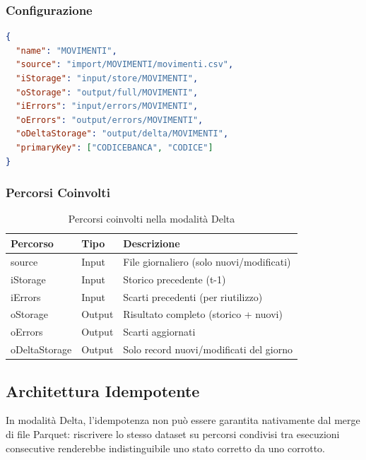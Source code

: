 \documentclass[12pt,a4paper,openright,twoside]{book}
\begin{document}
\newpage
\subsubsection{Configurazione}

\begin{lstlisting}[language=JSON, caption={Esempio di configurazione in modalità Delta}, label={lst:config-delta}]
{
  "name": "MOVIMENTI",
  "source": "import/MOVIMENTI/movimenti.csv",
  "iStorage": "input/store/MOVIMENTI",
  "oStorage": "output/full/MOVIMENTI",
  "iErrors": "input/errors/MOVIMENTI",
  "oErrors": "output/errors/MOVIMENTI",
  "oDeltaStorage": "output/delta/MOVIMENTI",
  "primaryKey": ["CODICEBANCA", "CODICE"]
}
\end{lstlisting}

\subsubsection{Percorsi Coinvolti}

\begin{table}[H]
\centering\small
\begin{tabularx}{\textwidth}{>{\ttfamily}l l X}
\toprule
\normalfont\textbf{Percorso} & \textbf{Tipo} & \textbf{Descrizione} \\
\midrule
source        & Input  & File giornaliero (solo nuovi/modificati) \\
iStorage      & Input  & Storico precedente (t-1) \\
iErrors       & Input  & Scarti precedenti (per riutilizzo) \\
oStorage      & Output & Risultato completo (storico + nuovi) \\
oErrors       & Output & Scarti aggiornati \\
oDeltaStorage & Output & Solo record nuovi/modificati del giorno \\
\bottomrule
\end{tabularx}
\caption{Percorsi coinvolti nella modalità Delta}
\label{tab:percorsi-delta}
\end{table}

\subsection{Architettura Idempotente}
In modalità Delta, l'idempotenza non può essere garantita nativamente dal merge di file Parquet: riscrivere lo stesso dataset su percorsi condivisi tra esecuzioni consecutive renderebbe indistinguibile uno stato corretto da uno corrotto.
\end{document}
